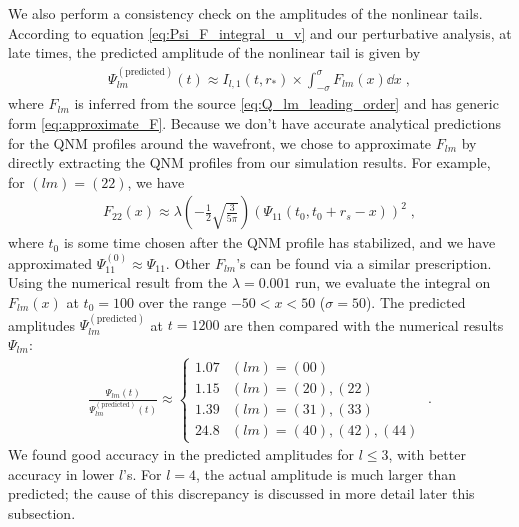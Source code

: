 \documentclass[reprint,aps,physrev,superscriptaddress,10pt,notitlepage,prd,nofootinbib,onecolumn]{revtex4-2}
\begin{document}
We also perform a consistency check on the amplitudes of the nonlinear tails.
According to equation \eqref{eq:Psi_F_integral_u_v} and our perturbative analysis, at late times, the predicted amplitude of the nonlinear tail is given by
\begin{align}
  \Psi_{lm}^{(\mathrm{predicted})}(t) \approx I_{l,1}(t,r_*) \times \int_{-\sigma}^\sigma F_{lm}(x) \dd{x} \;,
\end{align}
where $F_{lm}$ is inferred from the source \eqref{eq:Q_lm_leading_order} and has generic form \eqref{eq:approximate_F}.
Because we don't have accurate analytical predictions for the QNM profiles around the wavefront, we chose to approximate $F_{lm}$ by directly extracting the QNM profiles from our simulation results.
For example, for $(lm)=(22)$, we have
\begin{align}
  F_{22}(x)
  \approx \lambda \left(-\frac{1}{2}\sqrt{\frac{3}{5\pi}} \right) \left( \Psi_{11}(t_0,t_0+r_s-x) \right)^2 \;,
\end{align}
where $t_0$ is some time chosen after the QNM profile has stabilized, and we have approximated $\Psi_{11}^{(0)} \approx \Psi_{11}$.
Other $F_{lm}$'s can be found via a similar prescription.
Using the numerical result from the $\lambda=0.001$ run, we evaluate the integral on $F_{lm}(x)$ at $t_0=100$ over the range $-50 < x < 50$ ($\sigma = 50$).
The predicted amplitudes $\Psi_{lm}^{(\mathrm{predicted})}$ at $t=1200$ are then compared with the numerical results $\Psi_{lm}$:
\begin{align}
  \label{eq:coupled_tail_amplitude_comparison}
  \frac{\Psi_{lm}(t)}{\Psi_{lm}^{(\mathrm{predicted})}(t)} \approx
  \begin{cases}
    1.07 & (lm) = (00) \\
    1.15 & (lm) = (20), (22) \\
    1.39 & (lm) = (31), (33) \\
    24.8 & (lm) = (40), (42), (44)
  \end{cases}
  \;.
\end{align}
We found good accuracy in the predicted amplitudes for $l \leq 3$, with better accuracy in lower $l$'s.
For $l=4$, the actual amplitude is much larger than predicted; the cause of this discrepancy is discussed in more detail later this subsection.
\end{document}
